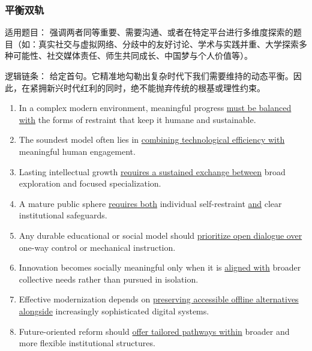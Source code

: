 

\subsubsection{平衡双轨}



适用题目： 强调两者同等重要、需要沟通、或者在特定平台进行多维度探索的题目（如：真实社交与虚拟网络、分歧中的友好讨论、学术与实践并重、大学探索多种可能性、社交媒体责任、师生共同成长、中国梦与个人价值等）。



逻辑链条： 给定首句。它精准地勾勒出复杂时代下我们需要维持的动态平衡。因此，在紧拥新兴时代红利的同时，绝不能抛弃传统的根基或理性约束。



\begin{enumerate}

    \item In a complex modern environment, meaningful progress \underline{must be balanced with} the forms of restraint that keep it humane and sustainable.

    \item The soundest model often lies in \underline{combining technological efficiency with} meaningful human engagement.

    \item Lasting intellectual growth \underline{requires a sustained exchange between} broad exploration and focused specialization.

    \item A mature public sphere \underline{requires both} individual self-restraint \underline{and} clear institutional safeguards.

    \item Any durable educational or social model should \underline{prioritize open dialogue over} one-way control or mechanical instruction.

    \item Innovation becomes socially meaningful only when it is \underline{aligned with} broader collective needs rather than pursued in isolation.

    \item Effective modernization depends on \underline{preserving accessible offline alternatives alongside} increasingly sophisticated digital systems.

    \item Future-oriented reform should \underline{offer tailored pathways within} broader and more flexible institutional structures.


\end{enumerate}
